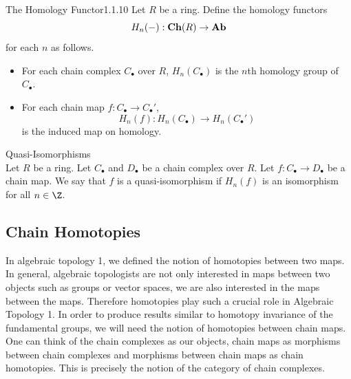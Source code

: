 \documentclass[a4paper]{article}
\begin{document}
\begin{defn}{The Homology Functor}{1.1.10} Let $R$ be a ring. Define the homology functors $$H_n(-):\bold{Ch}(R)\to\bold{Ab}$$ for each $n$ as follows. 
\begin{itemize}
\item For each chain complex $C_\bullet$ over $R$, $H_n(C_\bullet)$ is the $n$th homology group of $C_\bullet$. 
\item For each chain map $f:C_\bullet\to C_\bullet'$, $$H_n(f):H_n(C_\bullet)\to H_n(C_\bullet')$$ is the induced map on homology. 
\end{itemize}
\end{defn}

\begin{defn}{Quasi-Isomorphisms}{}\\
Let $R$ be a ring. Let $C_\bullet$ and $D_\bullet$ be a chain complex over $R$. Let $f:C_\bullet\to D_\bullet$ be a chain map. We say that $f$ is a quasi-isomorphism if $H_n(f)$ is an isomorphism for all $n\in\Z$. 
\end{defn}

\subsection{Chain Homotopies}
In algebraic topology 1, we defined the notion of homotopies between two maps. In general, algebraic topologists are not only interested in maps between two objects such as groups or vector spaces, we are also interested in the maps between the maps. Therefore homotopies play such a crucial role in Algebraic Topology 1. In order to produce results similar to homotopy invariance of the fundamental groups, we will need the notion of homotopies between chain maps. \\

One can think of the chain complexes as our objects, chain maps as morphisms between chain complexes and morphisms between chain maps as chain homotopies. This is precisely the notion of the category of chain complexes. 
\end{document}
